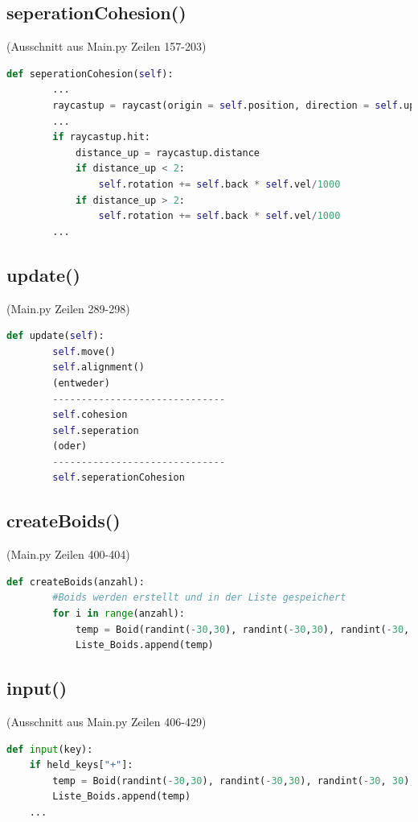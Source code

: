 \documentclass[a4paper, hidelinks, 12pt]{article}
\begin{document}
\subsection{seperationCohesion()}(Ausschnitt aus Main.py Zeilen 157-203)\label{CodeseperationCohesion}
\begin{lstlisting}[style=mystyle, language=Python]
	def seperationCohesion(self):
		...
		raycastup = raycast(origin = self.position, direction = self.up, distance = 5, traverse_target = scene, ignore = (Wireframe,))
		...
		if raycastup.hit:
			distance_up = raycastup.distance
			if distance_up < 2:
				self.rotation += self.back * self.vel/1000
			if distance_up > 2:
				self.rotation += self.back * self.vel/1000
		...
\end{lstlisting}

\subsection{update()}(Main.py Zeilen 289-298)\label{Codeupdate}
\begin{lstlisting}[style=mystyle, language=Python]
	def update(self):
		self.move()
		self.alignment()
		(entweder)
		------------------------------
		self.cohesion
		self.seperation
		(oder)
		------------------------------
		self.seperationCohesion
\end{lstlisting}

\subsection{createBoids()}(Main.py Zeilen 400-404)\label{CodecreateBoids}
\begin{lstlisting}[style=mystyle, language=Python]
	def createBoids(anzahl):
		#Boids werden erstellt und in der Liste gespeichert
		for i in range(anzahl):
			temp = Boid(randint(-30,30), randint(-30,30), randint(-30, 30), randint(0,360), randint(0,360), randint(0,360), uniform(0.0, 100.0), uniform(0.0, 10.0), 300.0, 1, groesse)
			Liste_Boids.append(temp)
\end{lstlisting}
\subsection{input()}(Ausschnitt aus Main.py Zeilen 406-429)\label{Codeinput}

\begin{lstlisting}[style=mystyle, language=Python]
def input(key):
	if held_keys["+"]:
		temp = Boid(randint(-30,30), randint(-30,30), randint(-30, 30), randint(0,360), randint(0,360), randint(0,360), uniform(50.0, 300.0), uniform(0.0, 10.0), 300.0, 1, groesse)
		Liste_Boids.append(temp)
	...
\end{lstlisting}

\newpage

\scriptsize
\newpage
\end{document}
